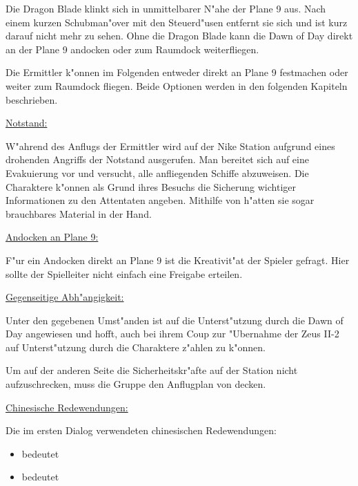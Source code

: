 Die Dragon Blade klinkt sich in unmittelbarer N"ahe der Plane 9 aus. Nach einem kurzen Schubman"over mit den Steuerd"usen entfernt sie sich und ist kurz darauf nicht mehr zu sehen. Ohne die Dragon Blade kann die Dawn of Day direkt an der Plane 9 andocken oder zum Raumdock weiterfliegen.
\vfill

\begin{remarks}
	Die Ermittler k"onnen im Folgenden entweder direkt an Plane 9 festmachen oder weiter zum Raumdock fliegen. Beide Optionen werden in den folgenden Kapiteln beschrieben.

	\underline{Notstand:}

	W"ahrend des Anflugs der Ermittler wird auf der Nike Station aufgrund eines drohenden Angriffs der Notstand ausgerufen. Man bereitet sich auf eine Evakuierung vor und versucht, alle anfliegenden Schiffe abzuweisen. Die Charaktere k"onnen als Grund ihres Besuchs die Sicherung wichtiger Informationen zu den Attentaten angeben. Mithilfe von \ml{} h"atten sie sogar brauchbares Material in der Hand.

	\underline{Andocken an Plane 9:}
	
	F"ur ein Andocken direkt an Plane 9 ist die Kreativit"at der Spieler gefragt. Hier sollte der Spielleiter nicht einfach eine Freigabe erteilen.

	\underline{Gegenseitige Abh"angigkeit:}

	Unter den gegebenen Umst"anden ist \xl{} auf die Unterst"utzung durch die Dawn of Day angewiesen und hofft, auch bei ihrem Coup zur "Ubernahme der Zeus II-2 auf Unterst"utzung durch die Charaktere z"ahlen zu k"onnen. 
	
	Um auf der anderen Seite die Sicherheitskr"afte auf der Station nicht aufzuschrecken, muss die Gruppe den Anflugplan von \xl{} decken.

	\underline{Chinesische Redewendungen:}

	Die im ersten Dialog verwendeten chinesischen Redewendungen:
	
	\begin{itemize}
		\item {} bedeutet 
		\item {} bedeutet 
	\end{itemize}
\end{remarks}
\vfill

\pagebreak